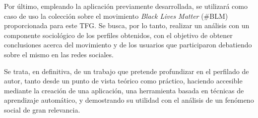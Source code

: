 \bigskip
Por último, empleando la aplicación previamente desarrollada, se utilizará como caso de uso la colección sobre el movimiento
\textit{Black Lives Matter} (\#BLM) proporcionada para este TFG. Se busca, por lo tanto, realizar un análisis con un componente sociológico
de los perfiles obtenidos,
con el objetivo de obtener conclusiones acerca del movimiento y de los usuarios que participaron debatiendo sobre el mismo en las redes sociales.

\bigskip
Se trata, en definitiva, de un trabajo que pretende profundizar en el perfilado de autor, tanto desde un punto de vista teórico como práctico,
haciendo accesible mediante la creación de una aplicación, una herramienta basada en técnicas de aprendizaje automático, y
demostrando su utilidad con el análisis de un fenómeno social de gran relevancia.
